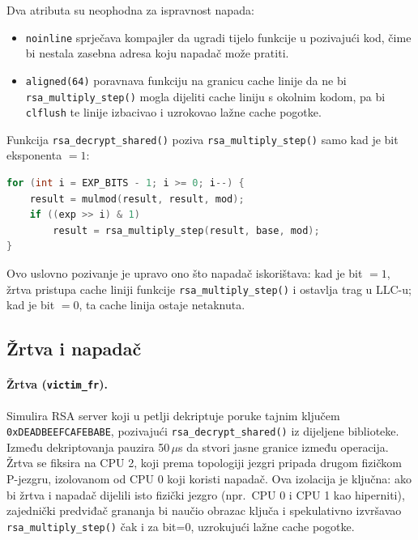 Dva atributa su neophodna za ispravnost napada:
\begin{itemize}
\item \texttt{noinline} sprječava kompajler da ugradi tijelo funkcije u pozivajući kod, čime bi nestala zasebna adresa koju napadač može pratiti.
\item \texttt{aligned(64)} poravnava funkciju na granicu cache linije da ne bi \texttt{rsa\_multiply\_step()} mogla dijeliti cache liniju s okolnim kodom, pa bi \texttt{clflush} te linije izbacivao i uzrokovao lažne cache pogotke.
\end{itemize}

Funkcija \texttt{rsa\_decrypt\_shared()} poziva \texttt{rsa\_multiply\_step()} samo kad je bit eksponenta $= 1$:

\begin{lstlisting}[language=C, caption={Uslovno pozivanje ciljane funkcije}, label=lst:fr_branch]
for (int i = EXP_BITS - 1; i >= 0; i--) {
    result = mulmod(result, result, mod);
    if ((exp >> i) & 1)
        result = rsa_multiply_step(result, base, mod);
}
\end{lstlisting}

Ovo uslovno pozivanje je upravo ono što napadač iskorištava: kad je bit $= 1$, žrtva pristupa cache liniji funkcije \texttt{rsa\_multiply\_step()} i ostavlja trag u LLC-u; kad je bit $= 0$, ta cache linija ostaje netaknuta.

\subsection{Žrtva i napadač}

\paragraph{Žrtva (\texttt{victim\_fr}).}
Simulira RSA server koji u petlji dekriptuje poruke tajnim ključem \texttt{0xDEADBEEFCAFEBABE}, pozivajući \texttt{rsa\_decrypt\_shared()} iz dijeljene biblioteke. Između dekriptovanja pauzira 50\,$\mu$s da stvori jasne granice između operacija. Žrtva se fiksira na CPU 2, koji prema topologiji jezgri pripada drugom fizičkom P-jezgru, izolovanom od CPU 0 koji koristi napadač. Ova izolacija je ključna: ako bi žrtva i napadač dijelili isto fizički jezgro (npr.\ CPU 0 i CPU 1 kao hiperniti), zajednički predviđač grananja bi naučio obrazac ključa i spekulativno izvršavao \texttt{rsa\_multiply\_step()} čak i za bit=0, uzrokujući lažne cache pogotke.

